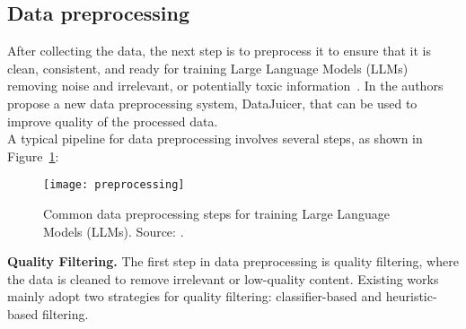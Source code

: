 \subsection{Data preprocessing}
\label{subsec:data-preprocessing}

After collecting the data, the next step is to preprocess it to ensure that it is clean, consistent, and ready for training Large Language Models (LLMs) removing noise and irrelevant, or potentially toxic information~\cite{chowdhery2022palm, rae2021scaling, longpre2023pretrainer}.
In \textcite{chen2023datajuicer} the authors propose a new data preprocessing system, DataJuicer, that can be used to improve quality of the processed data.\\
A typical pipeline for data preprocessing involves several steps, as shown in Figure~\ref{fig:preprocessing}:

\begin{figure}[H]
	\centering
	\texttt{[image: preprocessing]}
	\caption{Common data preprocessing steps for training Large Language Models (LLMs). Source: \textcite{survey}.}
	\label{fig:preprocessing}
\end{figure}

\textbf{Quality Filtering.}
The first step in data preprocessing is quality filtering, where the data is cleaned to remove irrelevant or low-quality content.
Existing works mainly adopt two strategies for quality filtering: classifier-based and heuristic-based filtering.

